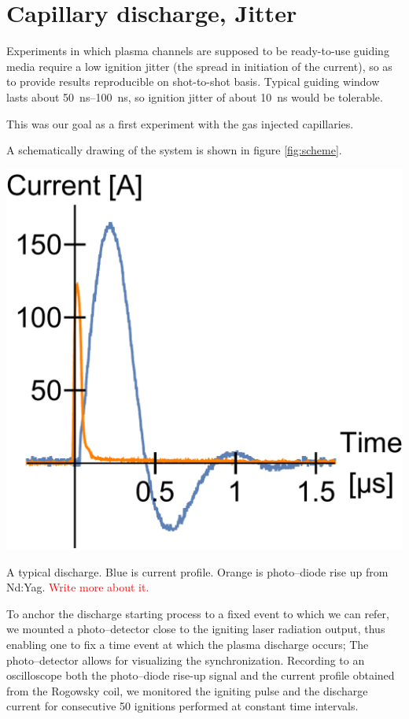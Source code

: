 \documentclass[justified,nofonts,nobib,openany]{tufte-book}
\begin{document}
\section{Capillary discharge, Jitter}\label{sec:jitter}
Experiments in which plasma channels are supposed to be ready-to-use guiding media require a low ignition jitter (the spread in initiation of the current), so as to provide results reproducible on shot-to-shot basis. Typical guiding window lasts about \SIrange{50}{100}{\ns}, so ignition jitter of about \SI{10}{ns} would be tolerable.

This was our goal as a first experiment with the gas injected capillaries.

A schematically drawing of the system is shown in figure \ref{fig:scheme}.
\begin{marginfigure}
    \includegraphics[width=\marginparwidth]{figures/jitter/discharge_sample.pdf}
    \caption{A typical discharge. Blue is current profile. Orange is photo--diode rise up from Nd:Yag. \textcolor{red}{Write more about it.}}
    \label{fig:discharge_sample}
\end{marginfigure}
To anchor the discharge starting process to a fixed event to which we can refer, we mounted a photo--detector close to the igniting laser radiation output, thus enabling one to fix a time event at which the plasma discharge occurs; The photo--detector allows for visualizing the synchronization. Recording to an oscilloscope both the photo--diode rise-up signal and the current profile obtained from the Rogowsky coil, we monitored the igniting pulse and the discharge current for consecutive 50 ignitions performed at constant time intervals.
\end{document}
